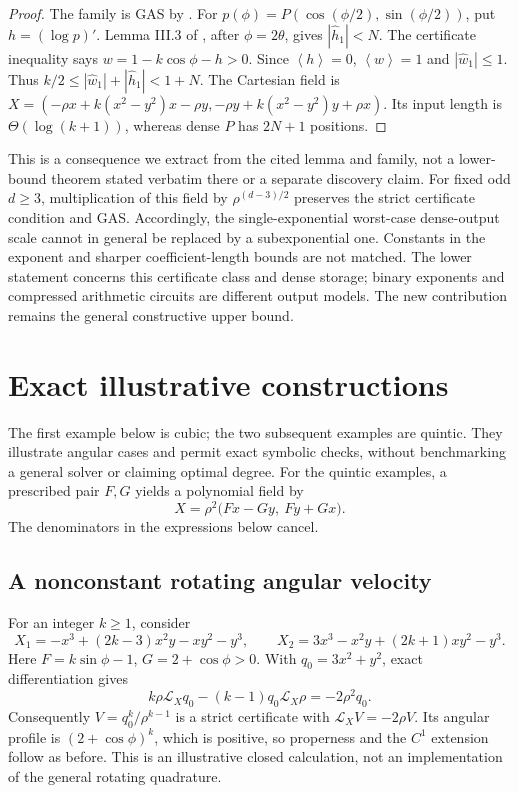 \documentclass[11pt]{article}
\theoremstyle{remark}\newtheorem{remark}[theorem]{Remark}
\newcommand{\mean}[1]{\left\langle #1\right\rangle}
\newcommand{\LX}{\mathcal L_X}
\begin{document}
\begin{proof}
The family is GAS by \cite[Section IV.D]{LF}. For
\(p(\phi)=P(\cos(\phi/2),\sin(\phi/2))\), put \(h=(\log p)'\).
Lemma III.3 of \cite{LF}, after \(\phi=2\theta\), gives
\(|\widehat h_1|<N\).
The certificate inequality says \(w=1-k\cos\phi-h>0\).
Since \(\mean h=0\), \(\mean w=1\) and \(|\widehat w_1|\leq1\).
Thus \(k/2\leq|\widehat w_1|+|\widehat h_1|<1+N\).
The Cartesian field is
\(X=(-\rho x+k(x^2-y^2)x-\rho y,-\rho y+k(x^2-y^2)y+\rho x)\).
Its input length is \(\Theta(\log(k+1))\), whereas dense \(P\) has \(2N+1\) positions.
\end{proof}

This is a consequence we extract from the cited lemma and family, not a lower-bound theorem stated verbatim there or a separate discovery claim. For fixed odd \(d\geq3\), multiplication of this field by \(\rho^{(d-3)/2}\) preserves the strict certificate condition and GAS. Accordingly, the single-exponential worst-case dense-output scale cannot in general be replaced by a subexponential one. Constants in the exponent and sharper coefficient-length bounds are not matched. The lower statement concerns this certificate class and dense storage; binary exponents and compressed arithmetic circuits are different output models. The new contribution remains the general constructive upper bound.

\section{Exact illustrative constructions}

The first example below is cubic; the two subsequent examples are quintic. They illustrate angular cases and permit exact symbolic checks, without benchmarking a general solver or claiming optimal degree. For the quintic examples, a prescribed pair \(F,G\) yields a polynomial field by
\begin{equation}\label{eq:examplefield}
        X=\rho^2\bigl(Fx-Gy,\ Fy+Gx\bigr).
\end{equation}
The denominators in the expressions below cancel.

\subsection{A nonconstant rotating angular velocity}

For an integer \(k\geq1\), consider
\[
 X_1=-x^3+(2k-3)x^2y-xy^2-y^3,\qquad
 X_2=3x^3-x^2y+(2k+1)xy^2-y^3.
\]
Here \(F=k\sin\phi-1\), \(G=2+\cos\phi>0\).
With \(q_0=3x^2+y^2\), exact differentiation gives
\[
 k\rho\LX q_0-(k-1)q_0\LX\rho=-2\rho^2q_0.
\]
Consequently \(V=q_0^k/\rho^{k-1}\) is a strict certificate with
\(\LX V=-2\rho V\). Its angular profile is \((2+\cos\phi)^k\),
which is positive, so properness and the \(C^1\) extension follow as before.
This is an illustrative closed calculation, not an implementation of the general rotating quadrature.
\end{document}
